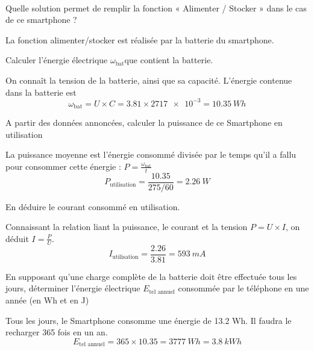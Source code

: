 \documentclass[10pt,fleqn]{article} %
\begin{document}
\begin{exercise}~

\begin{question}
  Quelle solution permet de remplir la fonction « Alimenter / Stocker » dans le cas de ce smartphone ?
\end{question} 
\begin{solution}
  La fonction alimenter/stocker est réalisée par la batterie du smartphone. 
\end{solution}

\begin{question}
  Calculer l’énergie électrique $\omega_\text{bat}$que contient la batterie.
\end{question}
\begin{solution}
  On connaît la tension de la batterie, ainsi que sa capacité. L'énergie 
  contenue dans la batterie est $$\omega_\text{bat} = U\times C = 3.81 \times \num{2717e-3}=\SI{10.35}{Wh} $$
\end{solution}

\begin{question}
  A partir des données annoncées, calculer la puissance de ce Smartphone en 
 utilisation
\end{question}
\begin{solution}
La puissance moyenne est l'énergie consommé divisée par le temps qu'il a fallu pour consommer cette énergie : $P = \frac{\omega_\text{bat}}{t}$ 
$$P_{\text{utilisation}} = \frac{10.35}{275/60} = \SI{2.26}{W}$$
\end{solution}

\begin{question}
  En déduire le courant consommé en utilisation. 
\end{question}
\begin{solution}
  Connaissant la relation liant la puissance, le courant et la tension 
  $P=U\times I$, on déduit $I = \frac{P}{U}$.
  $$I_{\text{utilisation}} = \frac{2.26}{3.81} = \SI{593}{mA}$$
\end{solution}

\begin{question}
  En supposant qu’une charge complète de la batterie doit être effectuée tous les jours, déterminer l’énergie électrique $E_{\text{tel annuel}}$ consommée par le téléphone en une année (en Wh et en J)
\end{question}
\begin{solution}
  Tous les jours, le Smartphone consomme une énergie de 13.2 Wh.
Il faudra le recharger 365 fois en un an.
$$E_{\text{tel annuel}} = 365 \times 10.35 = \SI{3 777}{Wh} = \SI{3.8}{kWh}$$
\end{solution}


\end{exercise}
\end{document}
